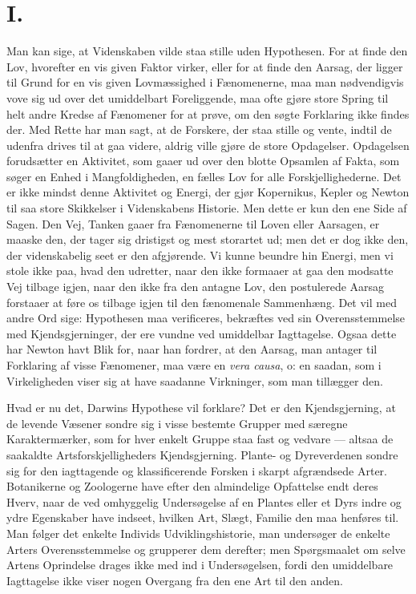 \documentclass[12pt,a4paper]{article}
\begin{document}
\section*{I.}

Man kan sige, at Videnskaben vilde staa stille uden Hypothesen. For at
finde den Lov, hvorefter en vis given Faktor virker, eller for at finde
den Aarsag, der ligger til Grund for en vis given Lovmæssighed i
Fænomenerne, maa man nødvendigvis vove sig ud over det umiddelbart
Foreliggende, maa ofte gjøre store Spring til helt andre Kredse af
Fænomener for at prøve, om den søgte Forklaring ikke findes der. Med
Rette har man sagt, at de Forskere, der staa stille og vente, indtil de
udenfra drives til at gaa videre, aldrig ville gjøre de store Opdagelser.
Opdagelsen forudsætter en Aktivitet, som gaaer ud over den blotte
Opsamlen af Fakta, som søger en Enhed i Mangfoldigheden, en fælles Lov
for alle Forskjellighederne. Det er ikke mindst denne Aktivitet og
Energi, der gjør Kopernikus, Kepler og Newton til saa store Skikkelser i
Videnskabens Historie. Men dette er kun den ene Side af Sagen. Den Vej,
Tanken gaaer fra Fænomenerne til Loven eller Aarsagen, er maaske den,
der tager sig dristigst og mest storartet ud; men det er dog ikke den,
der videnskabelig seet er den afgjørende. Vi kunne beundre hin Energi,
men vi stole ikke paa, hvad den udretter, naar den ikke formaaer at gaa
den modsatte Vej tilbage igjen, naar den ikke fra den antagne Lov, den
postulerede Aarsag forstaaer at føre os tilbage igjen til den fænomenale
Sammenhæng. Det vil med andre Ord sige: Hypothesen maa verificeres,
bekræftes ved sin Overensstemmelse med Kjendsgjerninger, der ere vundne
ved umiddelbar Iagttagelse. Ogsaa dette har Newton havt Blik for, naar
han fordrer, at den Aarsag, man antager til Forklaring af visse
Fænomener, maa være en \textit{vera causa}, o: en saadan, som i
Virkeligheden viser sig at have saadanne Virkninger, som man tillægger
den.

Hvad er nu det, Darwins Hypothese vil forklare? Det er den
Kjendsgjerning, at de levende Væsener sondre sig i visse bestemte Grupper
med særegne Karaktermærker, som for hver enkelt Gruppe staa fast og
vedvare --- altsaa de saakaldte Artsforskjelligheders Kjendsgjerning.
Plante- og Dyreverdenen sondre sig for den iagttagende og klassificerende
Forsken i skarpt afgrændsede Arter. Botanikerne og Zoologerne have efter
den almindelige Opfattelse endt deres Hverv, naar de ved omhyggelig
Undersøgelse af en Plantes eller et Dyrs indre og ydre Egenskaber have
indseet, hvilken Art, Slægt, Familie den maa henføres til. Man følger det
enkelte Individs Udviklingshistorie, man undersøger de enkelte Arters
Overensstemmelse og grupperer dem derefter; men Spørgsmaalet om selve
Artens Oprindelse drages ikke med ind i Undersøgelsen, fordi den
umiddelbare Iagttagelse ikke viser nogen Overgang fra den ene Art til den
anden.
\end{document}
